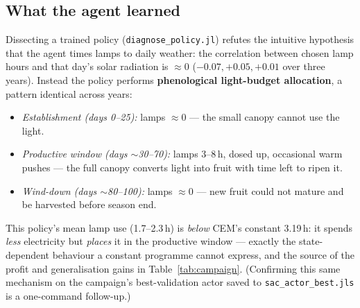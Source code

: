 \documentclass[11pt,a4paper]{article}
\begin{document}
\subsection{What the agent learned}
Dissecting a trained policy (\texttt{diagnose\_policy.jl}) refutes the intuitive hypothesis that the
agent times lamps to daily weather: the correlation between chosen lamp hours and that day's solar
radiation is $\approx 0$ ($-0.07,+0.05,+0.01$ over three years). Instead the policy performs
\textbf{phenological light-budget allocation}, a pattern identical across years:
\begin{itemize}[leftmargin=1.6em,itemsep=1pt]
  \item \emph{Establishment (days 0--25):} lamps $\approx 0$ --- the small canopy cannot use the light.
  \item \emph{Productive window (days $\sim$30--70):} lamps 3--8\,h,  dosed up, occasional warm
  pushes --- the full canopy converts light into fruit with time left to ripen it.
  \item \emph{Wind-down (days $\sim$80--100):} lamps $\approx 0$ --- new fruit could not mature and be
  harvested before season end.
\end{itemize}
This policy's mean lamp use (1.7--2.3\,h) is \emph{below} CEM's constant 3.19\,h: it spends
\emph{less} electricity but \emph{places} it in the productive window --- exactly the state-dependent
behaviour a constant programme cannot express, and the source of the profit and generalisation gains in
Table~\ref{tab:campaign}. (Confirming this same mechanism on the campaign's best-validation actor
saved to \texttt{sac\_actor\_best.jls} is a one-command follow-up.)
\end{document}
